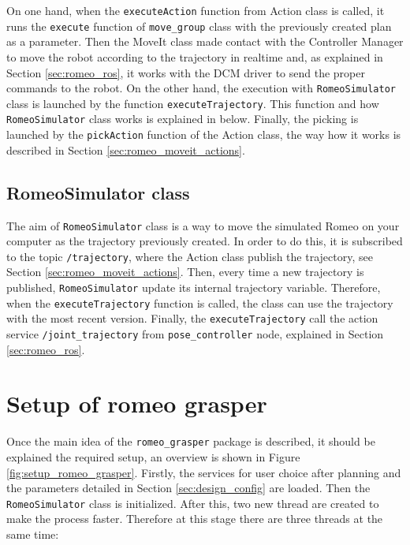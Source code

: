 \documentclass[12pt,a4paper,final,twoside,openright]{report}
\begin{document}
On one hand, when the \texttt{executeAction} function from Action class is called, it runs the \texttt{execute} function of \texttt{move\_group} class with the previously created plan as a parameter. Then the MoveIt class made contact with the Controller Manager to move the robot according to the trajectory in realtime and, as explained in Section \ref{sec:romeo_ros}, it works with the DCM driver to send the proper commands to the robot. On the other hand, the execution with \texttt{RomeoSimulator} class is launched by the function \texttt{executeTrajectory}. This function and how \texttt{RomeoSimulator} class works is explained in below. Finally, the picking is launched by the \texttt{pickAction} function of the Action class, the way how it works is described in Section \ref{sec:romeo_moveit_actions}.

\subsection{RomeoSimulator class}
\label{sec:romeo_simulator}

The aim of \texttt{RomeoSimulator} class is a way to move the simulated Romeo on your computer as the trajectory previously created. In order to do this, it is subscribed to the topic \texttt{/trajectory}, where the Action class publish the trajectory, see Section \ref{sec:romeo_moveit_actions}. Then, every time a new trajectory is published, \texttt{RomeoSimulator} update its internal trajectory variable. Therefore, when the \texttt{executeTrajectory} function is called, the class can use the trajectory with the most recent version. Finally, the \texttt{executeTrajectory} call the action service  \texttt{/joint\_trajectory} from \texttt{pose\_controller} node, explained in Section \ref{sec:romeo_ros}.


\section{Setup of romeo grasper}
\label{sec:impl_setup}

Once the main idea of the \texttt{romeo\_grasper} package is described, it should be explained the required setup, an overview is shown in Figure \ref{fig:setup_romeo_grasper}. Firstly, the services for user choice after planning and the parameters detailed in Section \ref{sec:design_config} are loaded. Then the \texttt{RomeoSimulator} class is initialized. After this, two new thread are created to make the process faster. Therefore at this stage there are three threads at the same time:
\end{document}

